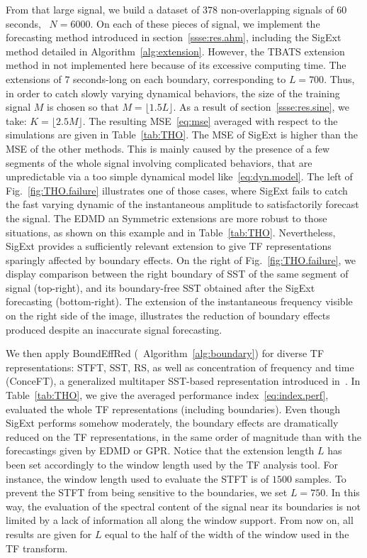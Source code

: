 From that large signal, we build a dataset of $378$ non-overlapping signals of 60 seconds, \ie~$N=6000$. On each of these pieces of signal, we implement the forecasting method introduced in section~\ref{ssse:res.ahm}, including the {\sf SigExt} method detailed in Algorithm~\ref{alg:extension}. However, the TBATS extension method in not implemented here because of its excessive computing time. The extensions of $7$ seconds-long on each boundary, corresponding to $L =700$. Thus, in order to catch slowly varying dynamical behaviors, the size of the training signal $M$ is chosen so that $M=\lfloor 1.5L\rfloor$. As a result of section~\ref{ssse:res.sine}, we take: $K=\lfloor2.5M\rfloor$. The resulting MSE~\eqref{eq:mse} averaged with respect to the simulations are given in Table~\ref{tab:THO}. The MSE of {\sf SigExt} is higher than the MSE of the other methods. This is mainly caused by the presence of a few segments of the whole signal involving complicated behaviors, that are unpredictable via a too simple dynamical model like~\eqref{eq:dyn.model}. The left of Fig.~\ref{fig:THO.failure} illustrates one of those cases, where {\sf SigExt} fails to catch the fast varying dynamic of the instantaneous amplitude to satisfactorily forecast the signal. The EDMD an Symmetric extensions are more robust to those situations, as shown on this example and in Table~\ref{tab:THO}. Nevertheless, {\sf SigExt} provides a sufficiently relevant extension to give TF representations sparingly affected by boundary effects. On the right of Fig.~\ref{fig:THO.failure}, we display comparison between the right boundary of SST of the same segment of signal (top-right), and its boundary-free SST obtained after the {\sf SigExt} forecasting (bottom-right). The extension of the instantaneous frequency visible on the right side of the image, illustrates the reduction of boundary effects produced despite an inaccurate signal forecasting.

We then apply {\sf BoundEffRed} (\ie~Algorithm~\ref{alg:boundary}) for diverse TF representations: STFT, SST, RS, as well as concentration of frequency and time (ConceFT), a generalized multitaper SST-based representation introduced in~\cite{Daubechies16conceft}. In Table~\ref{tab:THO}, we give the averaged performance index~\eqref{eq:index.perf}, evaluated the whole TF representations (including  boundaries). Even though {\sf SigExt} performs somehow moderately, the boundary effects are dramatically reduced on the TF representations, in the same order of magnitude than with the forecastings given by EDMD or GPR. Notice that the extension length $L$ has been set accordingly to the window length used by the TF analysis tool. For instance, the window length used to evaluate the STFT is of $1500$ samples. To prevent the STFT from being sensitive to the boundaries, we set $L=750$. In this way, the evaluation of the spectral content of the signal near its boundaries is not limited by a lack of information all along the window support. From now on, all results are given for $L$ equal to the half of the width of the window used in the TF transform.

